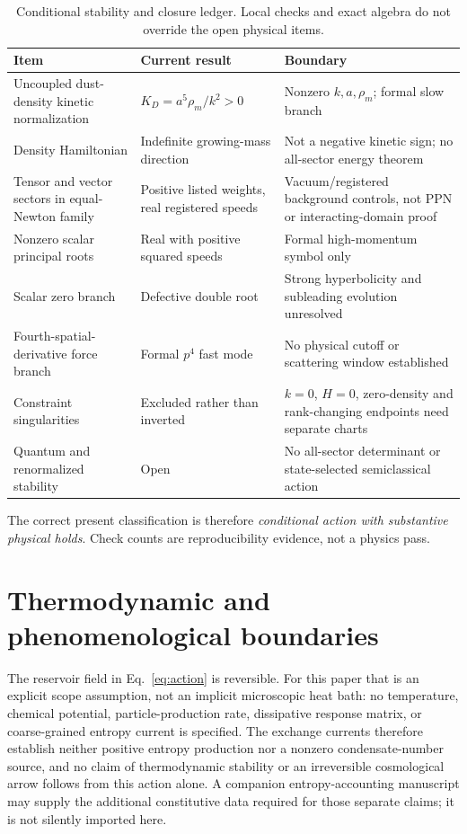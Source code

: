 \documentclass[aps,prd,reprint,superscriptaddress,nofootinbib,floatfix]{revtex4-2}
\begin{document}
\begin{table}[t]
\caption{Conditional stability and closure ledger.  Local checks and exact
algebra do not override the open physical items.}
\label{tab:stability}
\begin{ruledtabular}
\begin{tabular}{p{}p{}p{}}
Item & Current result & Boundary \\
\hline
Uncoupled dust-density kinetic normalization & \(K_D=a^5\rho_m/k^2>0\) &
Nonzero \(k,a,\rho_m\); formal slow branch \\
Density Hamiltonian & Indefinite growing-mass direction &
Not a negative kinetic sign; no all-sector energy theorem \\
Tensor and vector sectors in equal-Newton family & Positive listed weights,
real registered speeds & Vacuum/registered background controls, not PPN or
interacting-domain proof \\
Nonzero scalar principal roots & Real with positive squared speeds &
Formal high-momentum symbol only \\
Scalar zero branch & Defective double root & Strong hyperbolicity and
subleading evolution unresolved \\
Fourth-spatial-derivative force branch & Formal \(p^4\) fast mode &
No physical cutoff or scattering window established \\
Constraint singularities & Excluded rather than inverted &
\(k=0\), \(H=0\), zero-density and rank-changing endpoints need separate charts \\
Quantum and renormalized stability & Open & No all-sector determinant or
state-selected semiclassical action \\
\end{tabular}
\end{ruledtabular}
\end{table}

The correct present classification is therefore
\emph{conditional action with substantive physical holds}.  Check counts are
reproducibility evidence, not a physics pass.

\section{Thermodynamic and phenomenological boundaries}
\label{sec:phenomenology}

The reservoir field in Eq.~\eqref{eq:action} is reversible.  For this paper
that is an explicit scope assumption, not an implicit microscopic heat bath:
no temperature, chemical potential, particle-production rate, dissipative
response matrix, or coarse-grained entropy current is specified.  The exchange
currents therefore establish neither positive entropy production nor a
nonzero condensate-number source, and no claim of thermodynamic stability or
an irreversible cosmological arrow follows from this action alone.  A
companion entropy-accounting manuscript may supply the additional constitutive
data required for those separate claims; it is not silently imported here.
\end{document}

